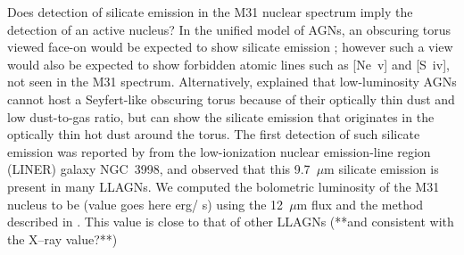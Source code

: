 Does detection of silicate emission in the M31 nuclear spectrum imply the detection of an active nucleus?
In the unified model of AGNs, an obscuring torus viewed face-on would be expected to show silicate emission
\citep{AGNtypes1995, AGNref}; however such a view would also be expected to show forbidden atomic lines such as [Ne~{\sc v}] and [S~{\sc iv}],
not seen in the M31 spectrum. Alternatively, \citet{Mason2012} explained that low-luminosity AGNs cannot 
host a Seyfert-like obscuring torus because of their optically thin dust and low dust-to-gas ratio, but can show
the silicate emission that originates in the optically thin hot dust around the torus.  The first detection of such silicate emission was 
reported by \citet{Sturm2005} from the low-ionization nuclear emission-line region (LINER) galaxy NGC~3998, and 
\citealt{Mason2012}  observed that this 9.7~$\mu$m silicate emission is present in many LLAGNs. 
We computed the bolometric luminosity of the M31 nucleus  to be (value goes here erg/ s) using the 12~$\mu$m flux 
and the method described in \citet{luminosity}. This value is close to that of other LLAGNs (**and consistent with the X--ray value?**)
